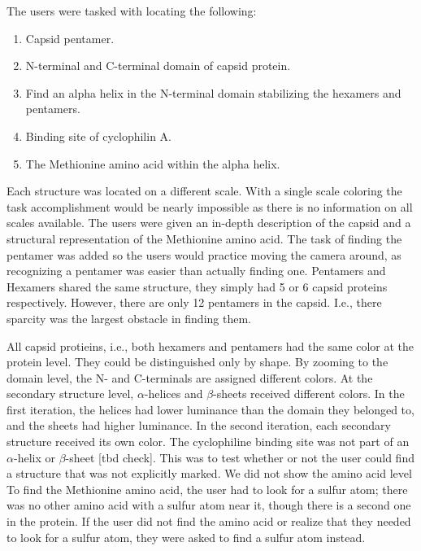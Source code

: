 \documentclass[review,journal]{vgtc}         %
\begin{document}
The users were tasked with locating the following:

\begin{enumerate}
	\item Capsid pentamer.
	\item N-terminal and C-terminal domain of capsid protein.
	\item Find an alpha helix in the N-terminal domain stabilizing the hexamers and pentamers.
	\item Binding site of cyclophilin A.
	\item The Methionine amino acid within the alpha helix.
\end{enumerate}

Each structure was located on a different scale. With a single scale coloring the task accomplishment would be nearly impossible as there is no information on all scales available.
The users were given an in-depth description of the capsid and a structural representation of the Methionine amino acid. 
The task of finding the pentamer was added so the users would practice moving the camera around, as recognizing a pentamer was easier than actually finding one. 
Pentamers and Hexamers shared the same structure, they simply had 5 or 6 capsid proteins respectively. 
However, there are only 12 pentamers in the capsid.
I.e., there sparcity was the largest obstacle in finding them.

All capsid protieins, i.e., both hexamers and pentamers had the same color at the protein level. They could be distinguished only by shape. By zooming to the domain level, the N- and C-terminals are assigned different colors. At the secondary structure level, $\alpha$-helices and $\beta$-sheets received different colors. In the first iteration, the helices had lower luminance than the domain they belonged to, and the sheets had higher luminance. In the second iteration, each secondary structure received its own color. 
The cyclophiline binding site was not part of an $\alpha$-helix or $\beta$-sheet [tbd check].
This was to test whether or not the user could find a structure that was not explicitly marked. 
We did not show the amino acid level
To find the Methionine amino acid, the user had to look for a sulfur atom; there was no other amino acid with a sulfur atom near it, though there is a second one in the protein. 
If the user did not find the amino acid or realize that they needed to look for a sulfur atom, they were asked to find a sulfur atom instead.
\end{document}
